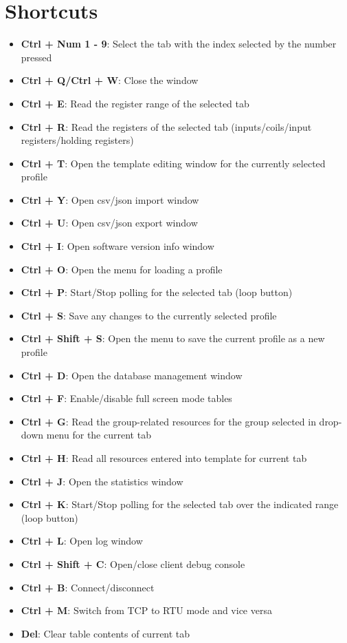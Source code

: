 
\chapter{Shortcuts}

\begin{itemize}
\item \textbf{Ctrl + Num 1 - 9}: Select the tab with the index selected by the number pressed
\item \textbf{Ctrl + Q/Ctrl + W}: Close the window
\item \textbf{Ctrl + E}: Read the register range of the selected tab
\item \textbf{Ctrl + R}: Read the registers of the selected tab (inputs/coils/input registers/holding registers)
\item \textbf{Ctrl + T}: Open the template editing window for the currently selected profile
\item \textbf{Ctrl + Y}: Open csv/json import window
\item \textbf{Ctrl + U}: Open csv/json export window
\item \textbf{Ctrl + I}: Open software version info window
\item \textbf{Ctrl + O}: Open the menu for loading a profile
\item \textbf{Ctrl + P}: Start/Stop polling for the selected tab (loop button)
\item \textbf{Ctrl + S}: Save any changes to the currently selected profile
\item \textbf{Ctrl + Shift + S}: Open the menu to save the current profile as a new profile
\item \textbf{Ctrl + D}: Open the database management window
\item \textbf{Ctrl + F}: Enable/disable full screen mode tables
\item \textbf{Ctrl + G}: Read the group-related resources for the group selected in drop-down menu for the current tab
\item \textbf{Ctrl + H}: Read all resources entered into template for current tab
\item \textbf{Ctrl + J}: Open the statistics window
\item \textbf{Ctrl + K}: Start/Stop polling for the selected tab over the indicated range (loop button)
\item \textbf{Ctrl + L}: Open log window
\item \textbf{Ctrl + Shift + C}: Open/close client debug console
\item \textbf{Ctrl + B}: Connect/disconnect
\item \textbf{Ctrl + M}: Switch from TCP to RTU mode and vice versa
\item \textbf{Del}: Clear table contents of current tab
\end{itemize}